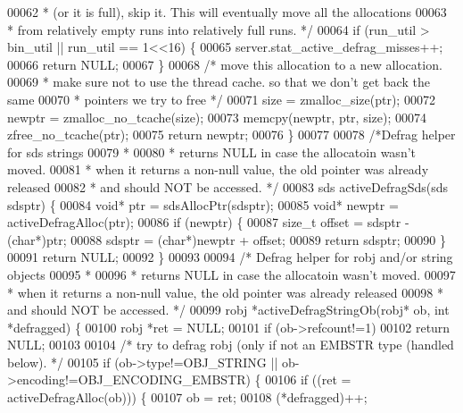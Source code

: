 \begin{DoxyCode}
00062 \textcolor{comment}{     * (or it is full), skip it. This will eventually move all the allocations}
00063 \textcolor{comment}{     * from relatively empty runs into relatively full runs. */}
00064     \textcolor{keywordflow}{if} (run\_util > bin\_util || run\_util == 1<<16) \{
00065         server.stat\_active\_defrag\_misses++;
00066         \textcolor{keywordflow}{return} NULL;
00067     \}
00068     \textcolor{comment}{/* move this allocation to a new allocation.}
00069 \textcolor{comment}{     * make sure not to use the thread cache. so that we don't get back the same}
00070 \textcolor{comment}{     * pointers we try to free */}
00071     size = zmalloc\_size(ptr);
00072     newptr = zmalloc\_no\_tcache(size);
00073     memcpy(newptr, ptr, size);
00074     zfree\_no\_tcache(ptr);
00075     \textcolor{keywordflow}{return} newptr;
00076 \}
00077 
00078 \textcolor{comment}{/*Defrag helper for sds strings}
00079 \textcolor{comment}{ *}
00080 \textcolor{comment}{ * returns NULL in case the allocatoin wasn't moved.}
00081 \textcolor{comment}{ * when it returns a non-null value, the old pointer was already released}
00082 \textcolor{comment}{ * and should NOT be accessed. */}
00083 sds activeDefragSds(sds sdsptr) \{
00084     \textcolor{keywordtype}{void}* ptr = sdsAllocPtr(sdsptr);
00085     \textcolor{keywordtype}{void}* newptr = activeDefragAlloc(ptr);
00086     \textcolor{keywordflow}{if} (newptr) \{
00087         size\_t offset = sdsptr - (\textcolor{keywordtype}{char}*)ptr;
00088         sdsptr = (\textcolor{keywordtype}{char}*)newptr + offset;
00089         \textcolor{keywordflow}{return} sdsptr;
00090     \}
00091     \textcolor{keywordflow}{return} NULL;
00092 \}
00093 
00094 \textcolor{comment}{/* Defrag helper for robj and/or string objects}
00095 \textcolor{comment}{ *}
00096 \textcolor{comment}{ * returns NULL in case the allocatoin wasn't moved.}
00097 \textcolor{comment}{ * when it returns a non-null value, the old pointer was already released}
00098 \textcolor{comment}{ * and should NOT be accessed. */}
00099 robj *activeDefragStringOb(robj* ob, \textcolor{keywordtype}{int} *defragged) \{
00100     robj *ret = NULL;
00101     \textcolor{keywordflow}{if} (ob->refcount!=1)
00102         \textcolor{keywordflow}{return} NULL;
00103 
00104     \textcolor{comment}{/* try to defrag robj (only if not an EMBSTR type (handled below). */}
00105     \textcolor{keywordflow}{if} (ob->type!=OBJ\_STRING || ob->encoding!=OBJ\_ENCODING\_EMBSTR) \{
00106         \textcolor{keywordflow}{if} ((ret = activeDefragAlloc(ob))) \{
00107             ob = ret;
00108             (*defragged)++;

\end{DoxyCode}
